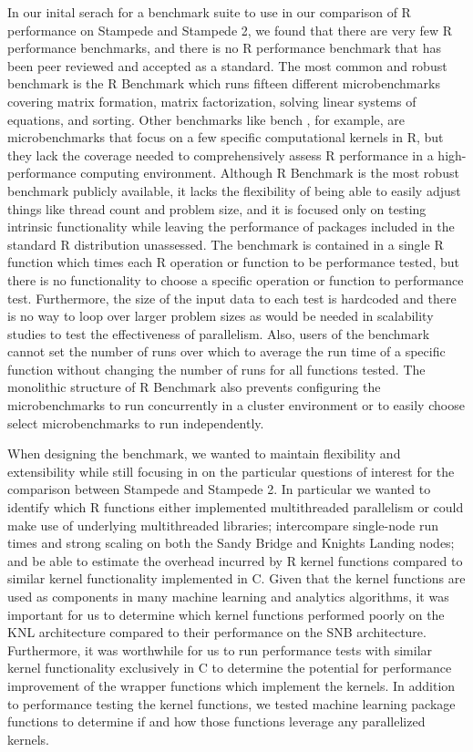 In our inital serach for a benchmark suite to use in our comparison of R performance on
Stampede and Stampede 2, we found that there are very few R performance benchmarks, and
there is no R performance benchmark that has been peer reviewed and accepted as a
standard. The most common and robust benchmark is the R Benchmark
\cite{urbanek:Rbenchmarks} which runs fifteen different microbenchmarks covering matrix
formation, matrix factorization, solving linear systems of equations, and sorting. Other
benchmarks like bench \cite{urbanek:Rbenchmarks}, for example, are microbenchmarks that
focus on a few specific computational kernels in R, but they lack the coverage needed to
comprehensively assess R performance in a high-performance computing environment. Although
R Benchmark is the most robust benchmark publicly available, it lacks the flexibility of
being able to easily adjust things like thread count and problem size, and it is focused
only on testing intrinsic functionality while leaving the performance of packages included
in the standard R distribution unassessed.  The benchmark is contained in a single R
function which times each R operation or function to be performance tested, but there is
no functionality to choose a specific operation or function to performance test.
Furthermore, the size of the input data to each test is hardcoded and there is no way to
loop over larger problem sizes as would be needed in scalability studies to test the
effectiveness of parallelism. Also, users of the benchmark cannot set the number of runs
over which to average the run time of a specific function without changing the number of
runs for all functions tested. The monolithic structure of R Benchmark also prevents
configuring the microbenchmarks to run concurrently in a cluster environment or to easily
choose select microbenchmarks to run independently.

When designing the benchmark, we wanted to maintain flexibility and extensibility while
still focusing in on the particular questions of interest for the comparison between
Stampede and Stampede 2. In particular we wanted to identify which R functions either
implemented multithreaded parallelism or could make use of underlying multithreaded
libraries; intercompare single-node run times and strong scaling on both the Sandy Bridge
and Knights Landing nodes; and be able to estimate the overhead incurred by R kernel
functions compared to similar kernel functionality implemented in C. Given that the kernel
functions are used as components in many machine learning and analytics algorithms, it was
important for us to determine which kernel functions performed poorly on the KNL
architecture compared to their performance on the SNB architecture. Furthermore, it was
worthwhile for us to run performance tests with similar kernel functionality exclusively
in C to determine the potential for performance improvement of the wrapper functions which
implement the kernels. In addition to performance testing the kernel functions, we tested
machine learning package functions to determine if and how those functions leverage any
parallelized kernels.

